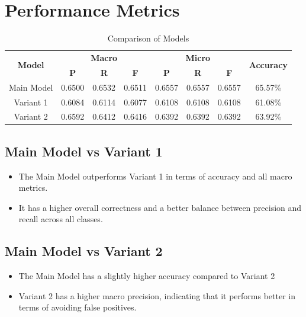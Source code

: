 \section{Performance Metrics}

\begin{table}[h!]
    \begin{center}
        \begin{tabular}{|c|c|c|c|c|c|c|c|}
            \hline
            \multirow{2}{*}{\textbf{Model}} & \multicolumn{3}{|c|}{\textbf{Macro}} & \multicolumn{3}{|c|}{\textbf{Micro}} &  \multirow{2}{*}{\textbf{Accuracy}}\\
            \cline{2-7}
            & \textbf{P} & \textbf{R} & \textbf{F} & \textbf{P} & \textbf{R} & \textbf{F} & \\
            \hline
            Main Model & 0.6500 & 0.6532 & 0.6511 & 0.6557 & 0.6557 & 0.6557 & 65.57\% \\
            \hline
            Variant 1 & 0.6084 & 0.6114 & 0.6077 & 0.6108 & 0.6108 & 0.6108 & 61.08\% \\
            \hline
            Variant 2 & 0.6592 & 0.6412 & 0.6416 & 0.6392 & 0.6392 & 0.6392 &  63.92\% \\
            \hline
        \end{tabular}
        \caption{Comparison of Models}
        \label{tab:model-comparison}
    \end{center}
\end{table}

    \subsection*{Main Model vs Variant 1}
    \begin{itemize}
        \item The Main Model outperforms Variant 1 in terms of accuracy and all macro metrics.
        \item It has a higher overall correctness and a better balance between precision and recall across all classes.
    \end{itemize}

    \subsection*{Main Model vs Variant 2}
    \begin{itemize}
        \item The Main Model has a slightly higher accuracy compared to Variant 2
        \item Variant 2 has a higher macro precision, indicating that it performs better in terms of avoiding false positives.
    \end{itemize}

